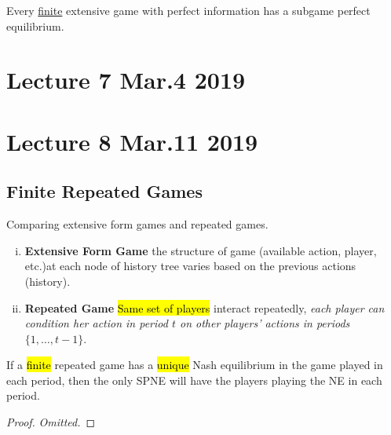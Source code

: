 \documentclass[11pt]{article}
\begin{document}
			\begin{theorem}
				Every \ul{finite} extensive game with perfect information has a subgame perfect equilibrium.
			\end{theorem}
		\section{Lecture 7 Mar.4 2019}
		
		\section{Lecture 8 Mar.11 2019}
			\subsection{Finite Repeated Games}
				\begin{remark}Comparing extensive form games and repeated games.
					\begin{enumerate}[(i)]
						\item \textbf{Extensive Form Game} the structure of game (available action, player, etc.)at each node of history tree varies based on the previous actions (history).
						\item \textbf{Repeated Game} \hl{Same set of players} interact repeatedly, \emph{each player can condition her action in period $t$ on other players' actions in periods $\{1,\dots,t-1\}$}.
					\end{enumerate}
				\end{remark}
				
				\begin{theorem}
					If a \hl{finite} repeated game has a \hl{unique} Nash equilibrium in the game played in each period, then the only SPNE will have the players playing the NE in each period.
					\begin{proof}
						\emph{Omitted.}
					\end{proof}
				\end{theorem}
			
\end{document}
